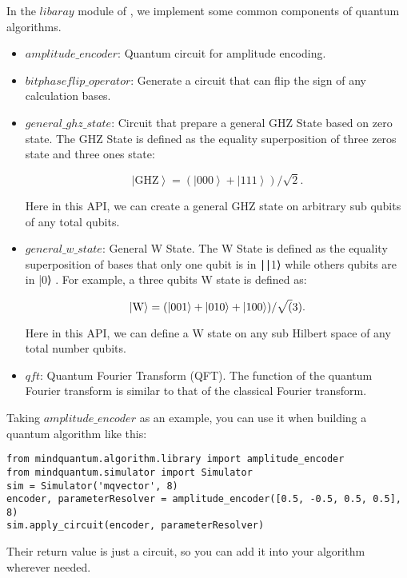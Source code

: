 In the $libaray$ module of \MindQuantum, we implement some common components of quantum algorithms.

\begin{itemize}

    \item $amplitude\_encoder$: Quantum circuit for amplitude encoding.

    \item $bitphaseflip\_operator$: Generate a circuit that can flip the sign of any calculation bases.

    \item $general\_ghz\_state$: Circuit that prepare a general GHZ State based on zero state. The GHZ State is defined as the equality superposition of three zeros state and three ones state:

    \begin{equation}
        \left|\text{GHZ}\right> = (\left|000\right> + \left|111\right>)/\sqrt{2}.
    \end{equation}

    Here in this API, we can create a general GHZ state on arbitrary sub qubits of any total qubits.

    \item $general\_w\_state$: General W State. The W State is defined as the equality superposition of bases that only one qubit is in ∣∣1⟩
     while others qubits are in |0⟩
    . For example, a three qubits W state is defined as:

    \begin{equation}
        \left|\rm W\right> = (\left|001\right> + \left|010\right> + \left|100\right>)/\sqrt(3).
    \end{equation}

    Here in this API, we can define a W state on any sub Hilbert space of any total number qubits.

    \item $qft$: Quantum Fourier Transform (QFT). The function of the quantum Fourier transform is similar to that of the classical Fourier transform.
\end{itemize}

Taking $amplitude\_encoder$ as an example, you can use it when building a quantum algorithm like this:
\begin{lstlisting}
from mindquantum.algorithm.library import amplitude_encoder
from mindquantum.simulator import Simulator
sim = Simulator('mqvector', 8)
encoder, parameterResolver = amplitude_encoder([0.5, -0.5, 0.5, 0.5], 8)
sim.apply_circuit(encoder, parameterResolver)
\end{lstlisting}
Their return value is just a circuit, so you can add it into your algorithm wherever needed.